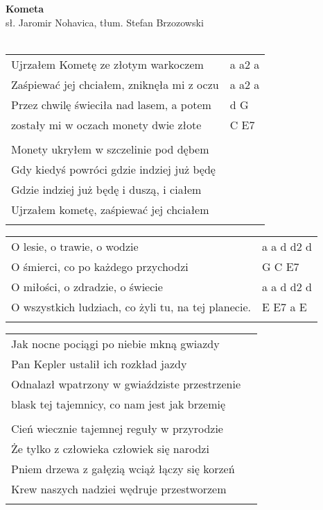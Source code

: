 \documentclass[a5paper]{article}
\begin{document}


\noindent
\fontsize{12pt}{15pt}\selectfont
\textbf{Kometa} \\
\fontsize{8pt}{10pt}\selectfont
sł. Jaromir Nohavica, tłum. Stefan Brzozowski \\ \\
\fontsize{10pt}{12pt}\selectfont
{}
\begin{tabular}{@{}p{8.50cm}p{3cm}@{}}
\noindent
Ujrzałem Kometę ze złotym warkoczem & a a2 a \\
Zaśpiewać jej chciałem, zniknęła mi z oczu & a a2 a \\
Przez chwilę świeciła nad lasem, a potem & d G \\
zostały mi w oczach monety dwie złote & C E7 \\ \\
 
Monety ukryłem w szczelinie pod dębem \\
Gdy kiedyś powróci gdzie indziej już będę \\
Gdzie indziej już będę i duszą, i ciałem \\
Ujrzałem kometę, zaśpiewać jej chciałem \\ \\
\end{tabular}

\begin{tabular}{@{}p{7.50cm}p{3.5cm}@{}}
\noindent
O lesie, o trawie, o wodzie & a a d d2 d \\
O śmierci, co po każdego przychodzi & G C E7 \\
O miłości, o zdradzie, o świecie & a a d d2 d \\
O wszystkich ludziach, co żyli tu, na tej planecie. & E E7 a E \\ \\
\end{tabular}

\noindent
\begin{tabular}{@{}p{9.50cm}p{3cm}@{}}
Jak nocne pociągi po niebie mkną gwiazdy \\
Pan Kepler ustalił ich rozkład jazdy \\
Odnalazł wpatrzony w gwiaździste przestrzenie \\
blask tej tajemnicy, co nam jest jak brzemię \\ \\
 
Cień wiecznie tajemnej reguły w przyrodzie \\
Że tylko z człowieka człowiek się narodzi \\
Pniem drzewa z gałęzią wciąż łączy się korzeń \\
Krew naszych nadziei wędruje przestworzem \\ \\
\end{tabular}
\end{document}
